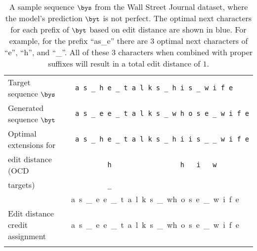 \begin{table}[t]
\vspace*{-.2cm}
\begin{center}
\begin{tabular}{@{}ll@{}}%
\toprule
Target sequence $\bys$ & \texttt{~a~s~\_~h~e~\_~t~a~l~k~s~\_~h~i~s~\_~w~i~f~e}\\[.1cm]
Generated sequence $\byt$ & \texttt{~a~s~\_~e~e~\_~t~a~l~k~s~\_~w~h~o~s~e~\_~w~i~f~e}\\[.1cm]
Optimal extensions for & \texttt{\color{blue} a~s~\_~h~e~\_~t~a~l~k~s~\_~h~i~i~s~\_~\_~w~i~f~e}\\
edit distance (OCD  & \texttt{\color{blue} ~~~~~~~~h~~~~~~~~~~~~~~~~~h~~~i~~~w}\\
targets)           & \texttt{\color{blue} ~~~~~~~~\_}\\
\comment{\hline
\hline
Hamming mismatch & a~s~\_~{\color{red}e}~e~\_~t~a~l~k~s~\_~{\color{red}wh~o~s~e~\_~w~i~f~e}\\
\hline
Edit distance credit assignment & a~s~\_~{\color{red}e}~e~\_~t~a~l~k~s~\_~{\color{red}w}h~{\color{red}o}~s~{\color{red}e}~\_~w~i~f~e\\ }
\bottomrule
\end{tabular}
\end{center}
\caption{A sample sequence $\bys$ from the Wall Street Journal dataset, where the model's prediction $\byt$ is not perfect. The optimal next characters for each prefix of $\byt$ based on edit distance are shown in blue. For example, for the prefix ``as\_e'' there are $3$ optimal next characters of ``e'', ``h'', and ``\_''. All of these $3$ characters when combined with proper suffixes will result in a total edit distance of $1$.
}\label{tab:sample}
\vspace*{-.2cm}
\end{table}


